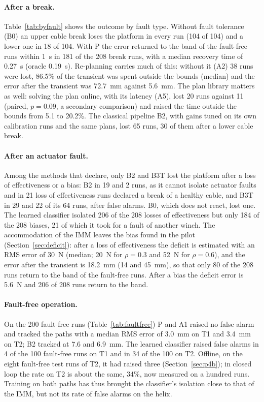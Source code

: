 \documentclass[10pt]{article}
\begin{document}
\paragraph{After a break.} Table~\ref{tab:byfault} shows the outcome by fault type. Without fault tolerance (B0) an upper cable break loses the platform in every run (104 of 104) and a lower one in 18 of 104. With P the error returned to the band of the fault-free runs within 1~s in 181 of the 208 break runs, with a median recovery time of 0.27~s (oracle 0.19~s). Re-planning carries much of this: without it (A2) 38 runs were lost, 86.5\% of the transient was spent outside the bounds (median) and the error after the transient was 72.7~mm against 5.6~mm. The plan library matters as well: solving the plan online, with its latency (A5), lost 20 runs against 11 (paired, $p=0.09$, a secondary comparison) and raised the time outside the bounds from 5.1 to 20.2\%. The classical pipeline B2, with gains tuned on its own calibration runs and the same plans, lost 65 runs, 30 of them after a lower cable break.

\paragraph{After an actuator fault.} Among the methods that declare, only B2 and B3T lost the platform after a loss of effectiveness or a bias: B2 in 19 and 2 runs, as it cannot isolate actuator faults and in 21 loss of effectiveness runs declared a break of a healthy cable, and B3T in 29 and 22 of its 64 runs, after false alarms. B0, which does not react, lost one. The learned classifier isolated 206 of the 208 losses of effectiveness but only 184 of the 208 biases, 21 of which it took for a fault of another winch. The accommodation of the IMM leaves the bias found in the pilot (Section~\ref{sec:deficit}): after a loss of effectiveness the deficit is estimated with an RMS error of 30~N (median; 20~N for $\rho=0.3$ and 52~N for $\rho=0.6$), and the error after the transient is 18.2~mm (14 and 45~mm), so that only 80 of the 208 runs return to the band of the fault-free runs. After a bias the deficit error is 5.6~N and 206 of 208 runs return to the band.



\paragraph{Fault-free operation.} On the 200 fault-free runs (Table~\ref{tab:faultfree}) P and A1 raised no false alarm and tracked the paths with a median RMS error of 3.0~mm on T1 and 3.4~mm on T2; B2 tracked at 7.6 and 6.9~mm. The learned classifier raised false alarms in 4 of the 100 fault-free runs on T1 and in 34 of the 100 on T2. Offline, on the eight fault-free test runs of T2, it had raised three (Section~\ref{sec:p4b}); in closed loop the rate on T2 is about the same, 34\%, now measured on a hundred runs. Training on both paths has thus brought the classifier's isolation close to that of the IMM, but not its rate of false alarms on the helix.
\end{document}
